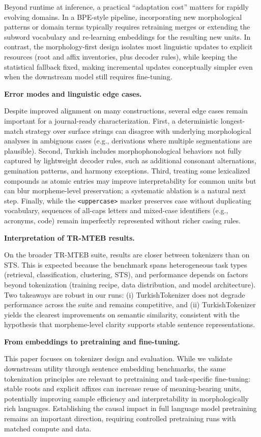 Beyond runtime at inference, a practical ``adaptation cost'' matters for rapidly evolving domains. In a BPE-style pipeline, incorporating new morphological patterns or domain terms typically requires retraining merges or extending the subword vocabulary and re-learning embeddings for the resulting new units. In contrast, the morphology-first design isolates most linguistic updates to explicit resources (root and affix inventories, plus decoder rules), while keeping the statistical fallback fixed, making incremental updates conceptually simpler even when the downstream model still requires fine-tuning.

\textbf{Error modes and linguistic edge cases.}

Despite improved alignment on many constructions, several edge cases remain important for a journal-ready characterization. First, a deterministic longest-match strategy over surface strings can disagree with underlying morphological analyses in ambiguous cases (e.g., derivations where multiple segmentations are plausible). Second, Turkish includes morphophonological behaviors not fully captured by lightweight decoder rules, such as additional consonant alternations, gemination patterns, and harmony exceptions. Third, treating some lexicalized compounds as atomic entries may improve interpretability for common units but can blur morpheme-level preservation; a systematic ablation is a natural next step. Finally, while the \texttt{<uppercase>} marker preserves case without duplicating vocabulary, sequences of all-caps letters and mixed-case identifiers (e.g., acronyms, code) remain imperfectly represented without richer casing rules.

\textbf{Interpretation of TR-MTEB results.}

On the broader TR-MTEB suite, results are closer between tokenizers than on STS. This is expected because the benchmark spans heterogeneous task types (retrieval, classification, clustering, STS), and performance depends on factors beyond tokenization (training recipe, data distribution, and model architecture). Two takeaways are robust in our runs:
(i) TurkishTokenizer does not degrade performance across the suite and remains competitive, and
(ii) TurkishTokenizer yields the clearest improvements on semantic similarity, consistent with the hypothesis that morpheme-level clarity supports stable sentence representations.

\textbf{From embeddings to pretraining and fine-tuning.}

This paper focuses on tokenizer design and evaluation. While we validate downstream utility through sentence embedding benchmarks, the same tokenization principles are relevant to pretraining and task-specific fine-tuning: stable roots and explicit affixes can increase reuse of meaning-bearing units, potentially improving sample efficiency and interpretability in morphologically rich languages. Establishing the causal impact in full language model pretraining remains an important direction, requiring controlled pretraining runs with matched compute and data.
